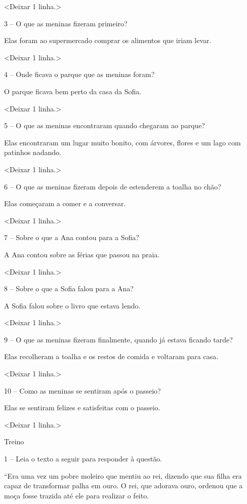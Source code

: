 \textless{}Deixar 1 linha.\textgreater{}

3 -- O que as meninas fizeram primeiro?

Elas foram ao supermercado comprar os alimentos que iriam levar.

\textless{}Deixar 1 linha.\textgreater{}

4 -- Onde ficava o parque que as meninas foram?

O parque ficava bem perto da casa da Sofia.

\textless{}Deixar 1 linha.\textgreater{}

5 -- O que as meninas encontraram quando chegaram ao parque?

Elas encontraram um lugar muito bonito, com árvores, flores e um lago
com patinhos nadando.

\textless{}Deixar 1 linha.\textgreater{}

6 -- O que as meninas fizeram depois de estenderem a toalha no chão?

Elas começaram a comer e a conversar.

\textless{}Deixar 1 linha.\textgreater{}

7 -- Sobre o que a Ana contou para a Sofia?

A Ana contou sobre as férias que passou na praia.

\textless{}Deixar 1 linha.\textgreater{}

8 -- Sobre o que a Sofia falou para a Ana?

A Sofia falou sobre o livro que estava lendo.

\textless{}Deixar 1 linha.\textgreater{}

9 -- O que as meninas fizeram finalmente, quando já estava ficando
tarde?

Elas recolheram a toalha e os restos de comida e voltaram para casa.

\textless{}Deixar 1 linha.\textgreater{}

10 -- Como as meninas se sentiram após o passeio?

Elas se sentiram felizes e satisfeitas com o passeio.

\textless{}Deixar 1 linha.\textgreater{}

Treino

1 -- Leia o texto a seguir para responder à questão.

``Era uma vez um pobre moleiro que mentiu ao rei, dizendo que sua filha
era capaz de transformar palha em ouro. O rei, que adorava ouro, ordenou
que a moça fosse trazida até ele para realizar o feito.


